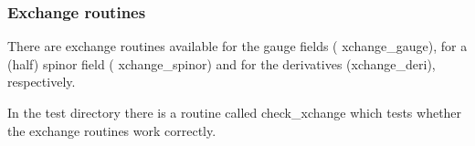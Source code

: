 \subsubsection{Exchange routines}

There are exchange routines available for the gauge fields ({\ttfamily
  xchange\_gauge}), for a (half) spinor field ({\ttfamily
  xchange\_spinor}) and for the derivatives ({\ttfamily xchange\_deri}),
respectively.

In the test directory there is a routine called {\ttfamily
  check\_xchange} which tests whether the exchange routines work correctly.


